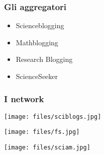 \begin{frame}[aggregatori]
 \frametitle{Gli aggregatori}
  \begin{itemize}
   \item<1-> Scienceblogging
   \item<2-> Mathblogging
   \item<3-> Research Blogging
   \item<4-> ScienceSeeker
  \end{itemize}
\end{frame}

\begin{frame}[network]
 \frametitle{I network}
 \begin{center}
  \texttt{[image: files/sciblogs.jpg]}
 \end{center}
 \begin{center}
  \texttt{[image: files/fs.jpg]}
 \end{center}
 \begin{center}
  \texttt{[image: files/sciam.jpg]}
 \end{center}
\end{frame}
